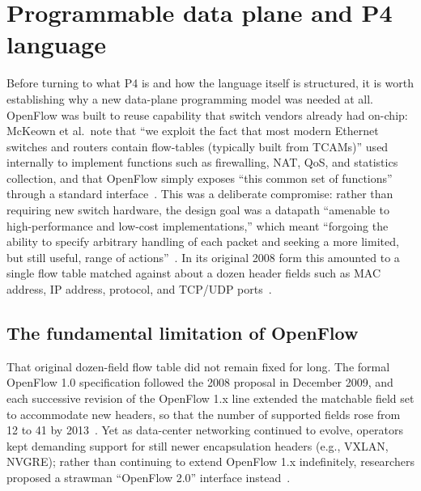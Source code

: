 \section{Programmable data plane and P4 language}
Before turning to what P4 is and how the language itself is structured, it is worth establishing why a new data-plane programming model was needed at all. OpenFlow was built to reuse capability that switch vendors already had on-chip: McKeown et al.\ note that ``we exploit the fact that most modern Ethernet switches and routers contain flow-tables (typically built from TCAMs)'' used internally to implement functions such as firewalling, NAT, QoS, and statistics collection, and that OpenFlow simply exposes ``this common set of functions'' through a standard interface~\cite{mckeown2008openflow}. This was a deliberate compromise: rather than requiring new switch hardware, the design goal was a datapath ``amenable to high-performance and low-cost implementations,'' which meant ``forgoing the ability to specify arbitrary handling of each packet and seeking a more limited, but still useful, range of actions''~\cite{mckeown2008openflow}. In its original 2008 form this amounted to a single flow table matched against about a dozen header fields such as MAC address, IP address, protocol, and TCP/UDP ports~\cite{bosshart2014p4}.

\subsection{The fundamental limitation of OpenFlow}\label{sec:openflow-limitation}
That original dozen-field flow table did not remain fixed for long. The formal OpenFlow 1.0 specification followed the 2008 proposal in December 2009, and each successive revision of the OpenFlow 1.x line extended the matchable field set to accommodate new headers, so that the number of supported fields rose from 12 to 41 by 2013~\cite{bosshart2014p4}. Yet as data-center networking continued to evolve, operators kept demanding support for still newer encapsulation headers (e.g., VXLAN, NVGRE); rather than continuing to extend OpenFlow 1.x indefinitely, researchers proposed a strawman ``OpenFlow 2.0'' interface instead~\cite{bosshart2014p4}.

